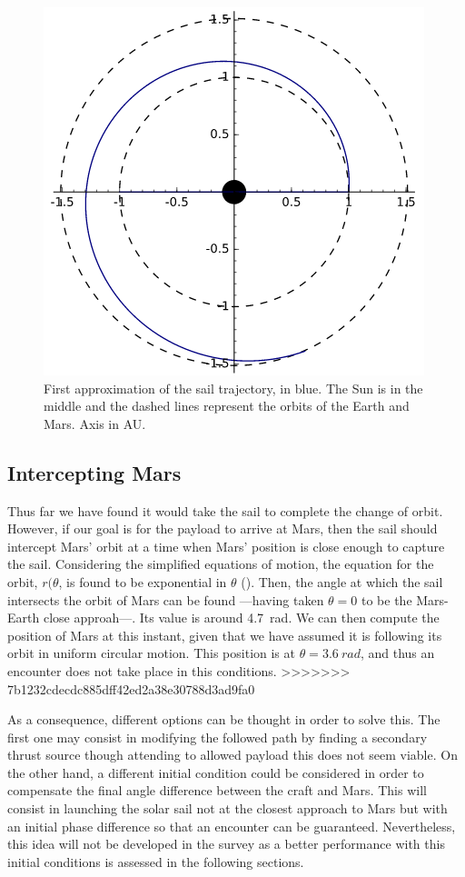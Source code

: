 \documentclass[twocolumn,12pt,a4paper]{article}
\numberwithin{equation}{section}
\begin{document}
\begin{figure}
	\centering
	\includegraphics[scale=0.5]{espiral.png}
	\caption{First approximation of the sail trajectory, in blue. The Sun is in the middle and the dashed lines represent the orbits of the Earth and Mars. Axis in AU.}
	\label{fig:logarithmic spiral}
\end{figure}


\subsection{Intercepting Mars}

Thus far we have found it would take the sail to complete the change of orbit. However, if our goal is for the payload to arrive at Mars, then the sail should intercept Mars' orbit at a time when Mars' position is close enough to capture the sail. Considering the simplified equations of motion, the equation for the orbit, \( r(\theta \), is found to be exponential in \( \theta \) (\cite[p. 155]{mcinnes}). Then, the angle at which the sail intersects the orbit of Mars can be found ---having taken \( \theta = 0	\) to be the Mars-Earth close approah---. Its value is around \SI{4.7}{rad}. We can then compute the position of Mars at this instant, given that we have assumed it is following its orbit in uniform circular motion. This position is at \( \theta = \SI{3.6}{rad} \), and thus an encounter does not take place in this conditions.
>>>>>>> 7b1232cdecdc885dff42ed2a38e30788d3ad9fa0

As a consequence, different options can be thought in order to solve this. The first one may consist in modifying the followed path by finding a secondary thrust source though attending to allowed payload this does not seem viable. On the other hand, a different initial condition could be considered in order to compensate the final angle difference between the craft and Mars. This will consist in launching the solar sail not at the closest approach to Mars but with an initial phase difference so that an encounter can be guaranteed. Nevertheless, this idea will not be developed in the survey as a better performance with this initial conditions is assessed in the following sections.
 
\end{document}
